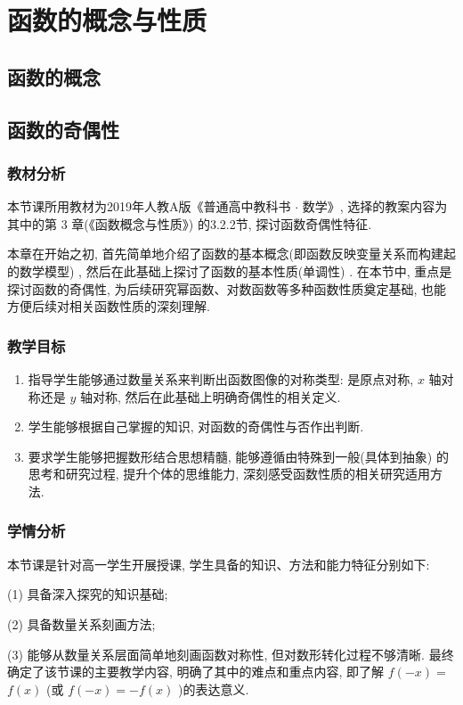 \chapter{函数的概念与性质}
\section{函数的概念}
\newpage
\section{函数的奇偶性}
\subsection{教材分析}
本节课\cite{YuAPOSSiDuanShiJiaoXueSheJiKeTiHanShuDeQiOuXing2024}所用教材为2019年人教A版《普通高中教科书 $\cdot$ 数学》, 选择的教案内容为其中的第 3 章(《函数概念与性质》) 的3.2.2节, 探讨函数奇偶性特征.

本章在开始之初, 首先简单地介绍了函数的基本概念(即函数反映变量关系而构建起的数学模型) , 然后在此基础上探讨了函数的基本性质(单调性) . 在本节中, 重点是探讨函数的奇偶性, 为后续研究幂函数、对数函数等多种函数性质奠定基础, 也能方便后续对相关函数性质的深刻理解.

\subsection{教学目标}
\begin{enumerate}
	\item 指导学生能够通过数量关系来判断出函数图像的对称类型: 是原点对称,  $x$ 轴对称还是 $y$ 轴对称, 然后在此基础上明确奇偶性的相关定义.
	\item 学生能够根据自己掌握的知识, 对函数的奇偶性与否作出判断.
	\item 要求学生能够把握数形结合思想精髓, 能够遵循由特殊到一般(具体到抽象) 的思考和研究过程, 提升个体的思维能力, 深刻感受函数性质的相关研究适用方法.
\end{enumerate}

\subsection{学情分析}
本节课是针对高一学生开展授课, 学生具备的知识、方法和能力特征分别如下:

(1) 具备深入探究的知识基础;

(2) 具备数量关系刻画方法;

(3) 能够从数量关系层面简单地刻画函数对称性, 但对数形转化过程不够清晰. 最终确定了该节课的主要教学内容, 明确了其中的难点和重点内容, 即了解 $f(-x)=$ $f(x)$ (或 $f(-x)=-f(x)$ )的表达意义.

